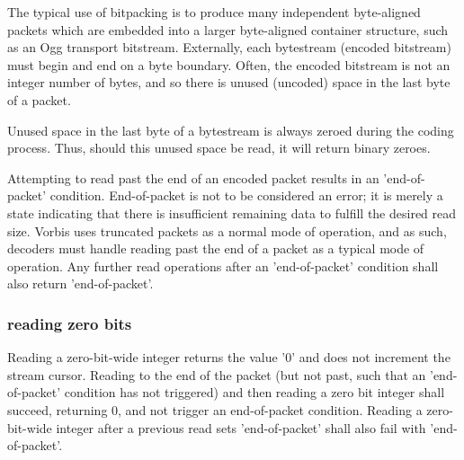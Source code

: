 The typical use of bitpacking is to produce many independent
byte-aligned packets which are embedded into a larger byte-aligned
container structure, such as an Ogg transport bitstream.  Externally,
each bytestream (encoded bitstream) must begin and end on a byte
boundary.  Often, the encoded bitstream is not an integer number of
bytes, and so there is unused (uncoded) space in the last byte of a
packet.

Unused space in the last byte of a bytestream is always zeroed during
the coding process.  Thus, should this unused space be read, it will
return binary zeroes.

Attempting to read past the end of an encoded packet results in an
'end-of-packet' condition.  End-of-packet is not to be considered an
error; it is merely a state indicating that there is insufficient
remaining data to fulfill the desired read size.  Vorbis uses truncated
packets as a normal mode of operation, and as such, decoders must
handle reading past the end of a packet as a typical mode of
operation. Any further read operations after an 'end-of-packet'
condition shall also return 'end-of-packet'.



\subsubsection{reading zero bits}

Reading a zero-bit-wide integer returns the value '0' and does not
increment the stream cursor.  Reading to the end of the packet (but
not past, such that an 'end-of-packet' condition has not triggered)
and then reading a zero bit integer shall succeed, returning 0, and
not trigger an end-of-packet condition.  Reading a zero-bit-wide
integer after a previous read sets 'end-of-packet' shall also fail
with 'end-of-packet'.






